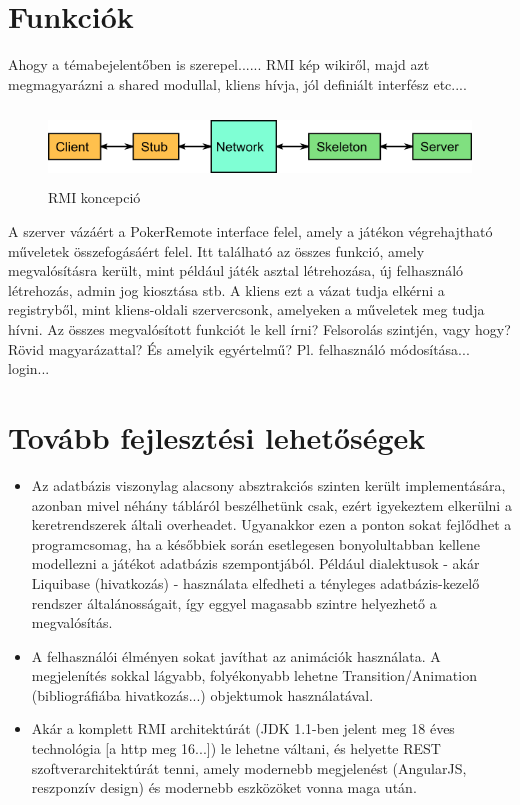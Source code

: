 \section{Funkciók}
Ahogy a témabejelentőben is szerepel...... RMI kép wikiről, majd azt megmagyarázni a shared modullal, kliens hívja, jól definiált interfész etc....
\begin{figure}[h!]
	\caption{RMI koncepció}
	\centering
	\includegraphics[width=14cm, height=2cm]{user-documentation/images/rmi.png}
\end{figure}
A szerver vázáért a PokerRemote interface felel, amely a játékon végrehajtható műveletek összefogásáért felel. Itt található az összes funkció, amely megvalósításra került, mint például játék asztal létrehozása, új felhasználó létrehozás, admin jog kiosztása stb. A kliens ezt a vázat tudja elkérni a registryből, mint kliens-oldali szervercsonk, amelyeken a műveletek meg tudja hívni. Az összes megvalósított funkciót le kell írni? Felsorolás szintjén, vagy hogy? Rövid magyarázattal? És amelyik egyértelmű? Pl. felhasználó módosítása... login...

\section{Tovább fejlesztési lehetőségek}
\begin{itemize}
\item Az adatbázis viszonylag alacsony absztrakciós szinten került implementására, azonban mivel néhány tábláról beszélhetünk csak, ezért igyekeztem elkerülni a keretrendszerek általi overheadet. Ugyanakkor ezen a ponton sokat fejlődhet a programcsomag, ha a későbbiek során esetlegesen bonyolultabban kellene modellezni a játékot adatbázis szempontjából. Például dialektusok - akár Liquibase (hivatkozás) - használata elfedheti a tényleges adatbázis-kezelő rendszer általánosságait, így eggyel magasabb szintre helyezhető a megvalósítás.
\item A felhasználói élményen sokat javíthat az animációk használata. A megjelenítés sokkal lágyabb, folyékonyabb lehetne Transition/Animation (bibliográfiába hivatkozás...) objektumok használatával.
\item Akár a komplett RMI architektúrát (JDK 1.1-ben jelent meg 18 éves technológia [a http meg 16...]) le lehetne váltani, és helyette REST szoftverarchitektúrát tenni, amely modernebb megjelenést (AngularJS, reszponzív design) és modernebb eszközöket vonna maga után.
\end{itemize}

